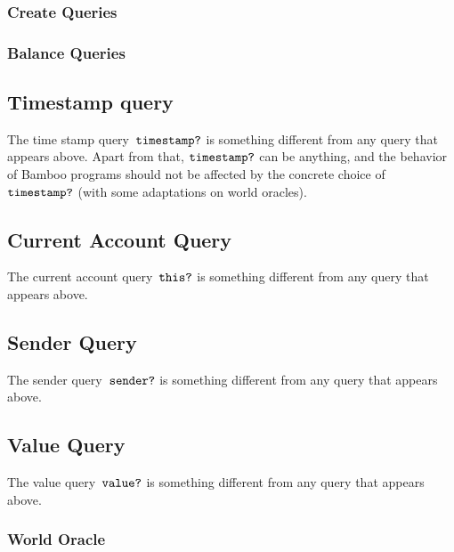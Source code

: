 \documentclass{book}
\begin{document}
\subsubsection{Create Queries}

\subsubsection{Balance Queries}

\subsection{Timestamp query}

\newcommand{\timestampQuery}{\text{\texttt{timestamp?}}}
The time stamp query~$\timestampQuery$ is something different from any query that appears above. Apart from that, $\timestampQuery$ can be anything, and the behavior of Bamboo programs should not be affected by the concrete choice of $\timestampQuery$ (with some adaptations on world oracles).

\subsection{Current Account Query}

\newcommand{\thisQuery}[0]{\text{\texttt{this?}}}

The current account query~$\thisQuery$ is something different from any query that appears above.

\subsection{Sender Query}

\newcommand{\senderQuery}{\text{\texttt{sender?}}}

The sender query~$\senderQuery$ is something different from any query that appears above.

\subsection{Value Query}

\newcommand{\valueQuery}{\text{\texttt{value?}}}

The value query~$\valueQuery$ is something different from any query that appears above.

\subsubsection{World Oracle}
\end{document}
